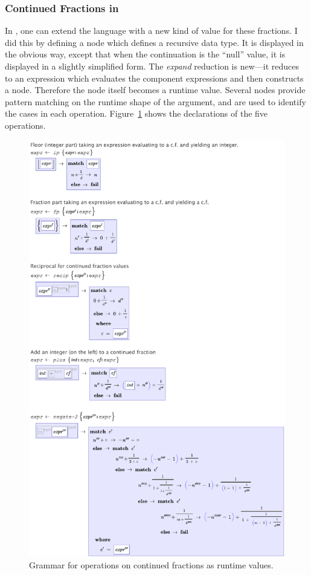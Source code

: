 \subsubsection{Continued Fractions in \Meta}
In \Meta, one can extend the language with a new kind of value for these fractions. I did this by defining a  node which defines a recursive data type. It is displayed in the obvious way, except that when the continuation is the ``null'' value, it is displayed in a slightly simplified form. The \emph{expand} reduction is new---it reduces to an expression which evaluates the component expressions and then constructs a node. Therefore the node itself becomes a runtime value. Several  nodes provide pattern matching on the runtime shape of the argument, and are used to identify the cases in each operation. Figure~\ref{fig-cf} shows the declarations of the five operations. %
\begin{figure}[th]
  \centering
  
  
  \includegraphics[scale=0.4]{src/image/continued-ops.pdf}
  
  \caption{Grammar for operations on continued fractions as runtime values.}
  \label{fig-cf}
\end{figure}

